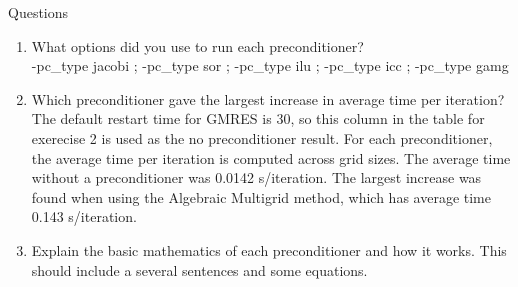 \documentclass[letterpaper]{article}
\begin{document}
Questions
\begin{enumerate}
    \item What options did you use to run each preconditioner? \\
    
    -pc\_type jacobi ; -pc\_type sor ; -pc\_type ilu ; -pc\_type icc ; -pc\_type gamg
    \item Which preconditioner gave the largest increase in average time per iteration? \\
    
    The default restart time for GMRES is 30, so this column in the table for exerecise 2 is used as the no preconditioner result. For each preconditioner, the average time per iteration is computed across grid sizes. The average time without a preconditioner was 0.0142 s/iteration. The largest increase was found when using the Algebraic Multigrid method, which has average time 0.143 s/iteration. 
    \item Explain the basic mathematics of each preconditioner and how it works. This should include a several sentences and some equations. \\


\end{enumerate}
\end{document}
